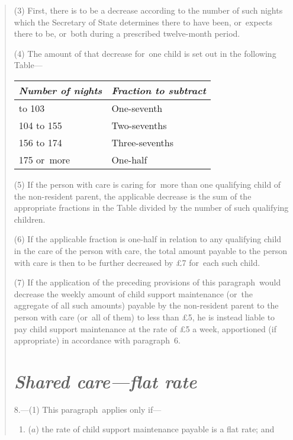 \documentclass[12pt,a4paper]{article}
\begin{document}
\begin{quotation}
(3) First, there is to be a decrease according to the number of such nights which the Secretary of State determines there to have been, or~expects there to be, or~both during a prescribed twelve-month period.

(4) The amount of that decrease for~one child is set out in the following Table—

\medskip

{\footnotesize\noindent
\begin{longtable}{ll}
\hline
\itshape Number of nights	& \itshape Fraction to subtract\\
\hline
\endhead
\hline
\endlastfoot
52 to 103	&One-seventh\\
104 to 155	&Two-sevenths\\
156 to 174	&Three-sevenths\\
175 or~more	&One-half\\
\end{longtable}

}

\medskip

(5) If the person with care is caring for~more than one qualifying child of the non-resident parent, the applicable decrease is the sum of the appropriate fractions in the Table divided by the number of such qualifying children.

(6) If the applicable fraction is one-half in relation to any qualifying child in the care of the person with care, the total amount payable to the person with care is then to be further decreased by £7 for~each such child.

(7) If the application of the preceding provisions of this paragraph~would decrease the weekly amount of child support maintenance (or~the aggregate of all such amounts) payable by the non-resident parent to the person with care (or~all of them) to less than £5, he is instead liable to pay child support maintenance at the rate of £5 a week, apportioned (if appropriate) in accordance with paragraph~6. 

\section*{\itshape Shared care—flat rate}

8.---(1) This paragraph~applies only if—
\begin{enumerate}\item[]
($a$) the rate of child support maintenance payable is a flat rate; and


\end{enumerate}
\end{quotation}
\end{document}
